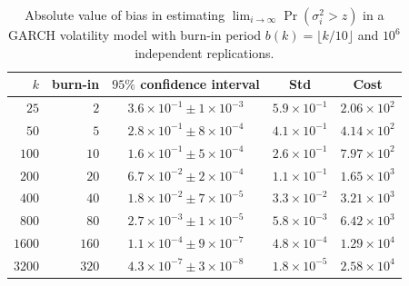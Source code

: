 \documentclass[a4paper,11pt]{article}
\begin{document}
\begin{table}
\caption{Absolute value of bias in estimating \(\lim_{i\rightarrow\infty}\Pr(\sigma_{i}^{2}> z)\) in a GARCH volatility model with  burn-in period  \(b(k)=\lfloor k/10\rfloor\) and \(10^{6}\) independent replications.}
\begin{center}
\begin{small}
\begin{tabular}{rrccc}\hline
$k$ &  burn-in   & $95\%$ confidence interval  & Std  & Cost \\ \hline
$25$&$2 $ &  $3.6\times10^{-1} \pm 1\times10^{-3}$ & $5.9\times10^{-1}$ & $2.06\times10^2$ \\
$50$&$5 $ &  $2.8\times10^{-1} \pm 8\times10^{-4}$ & $4.1\times10^{-1}$ & $4.14\times10^2$ \\
$100$&$10 $ &  $1.6\times10^{-1} \pm 5\times10^{-4}$ & $2.6\times10^{-1}$ & $7.97\times10^2$ \\
$200$&$20 $ &  $6.7\times10^{-2} \pm 2\times10^{-4}$ & $1.1\times10^{-1}$ & $1.65\times10^3$\\
$400$&$40 $ &  $1.8\times10^{-2} \pm 7\times10^{-5}$ & $3.3\times10^{-2}$ & $3.21\times10^3$\\
$800$&$80 $ &  $2.7\times10^{-3} \pm 1\times10^{-5}$ & $5.8\times10^{-3}$ & $6.42\times10^3$\\
$1600$&$160 $  & $1.1\times10^{-4} \pm 9\times10^{-7}$ & $4.8\times10^{-4}$ & $1.29\times10^4$\\
$3200$&$320 $ & $4.3\times10^{-7} \pm 3\times10^{-8}$ & $1.8\times10^{-5}$ & $2.58\times10^4$ \\
\hline\end{tabular}
 \end{small}
\end{center}
\label{tab:BiasGARCH0.1}
\end{table}
\end{document}
